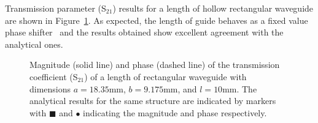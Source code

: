Transmission parameter (S$_{21}$) results for a length of hollow
rectangular waveguide are shown in
Figure~\ref{fig:hollow_h_plane_S_parameters}. As expected, the length
of guide behaves as a fixed value phase shifter~\cite{PelCoc1998} and
the results obtained show excellent agreement with the analytical
ones.
\begin{figure}
 \centering
 \caption{Magnitude (solid line) and phase (dashed line) of the transmission coefficient (S$_{21}$) of a length of rectangular waveguide with dimensions $a=18.35\text{mm}$, $b=9.175\text{mm}$, and $l = 10\text{mm}$. The analytical results for the same structure are indicated by markers with $\blacksquare$ and $\bullet$ indicating the magnitude and phase respectively.}
 \label{fig:hollow_h_plane_S_parameters}
\end{figure}

